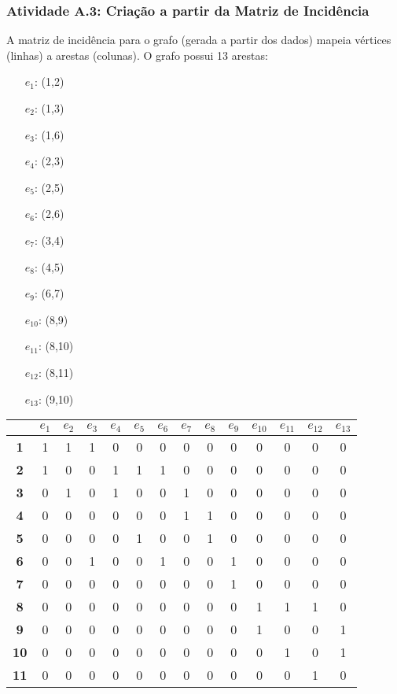 \documentclass[a4paper,12pt]{article}
\begin{document}
\subsubsection*{Atividade A.3: Criação a partir da Matriz de Incidência}
A matriz de incidência para o grafo (gerada a partir dos dados) mapeia vértices (linhas) a arestas (colunas). O grafo possui 13 arestas:
\begin{multicols}{2}
\begin{itemize}[nosep, leftmargin=*]
    \item[$e_1$:] (1,2) \quad \item[$e_2$:] (1,3) \quad \item[$e_3$:] (1,6)
    \item[$e_4$:] (2,3) \quad \item[$e_5$:] (2,5) \quad \item[$e_6$:] (2,6)
    \item[$e_7$:] (3,4) \quad \item[$e_8$:] (4,5) \quad \item[$e_9$:] (6,7)
    \item[$e_{10}$:] (8,9) \quad \item[$e_{11}$:] (8,10) \quad \item[$e_{12}$:] (8,11)
    \item[$e_{13}$:] (9,10)
\end{itemize}
\end{multicols}
\begin{center}
\scriptsize
\begin{tabular*}{\textwidth}{c|@{\extracolsep{\fill}}ccccccccccccc}
\rowcolor[gray]{0.9}
 & \textbf{$e_1$} & \textbf{$e_2$} & \textbf{$e_3$} & \textbf{$e_4$} & \textbf{$e_5$} & \textbf{$e_6$} & \textbf{$e_7$} & \textbf{$e_8$} & \textbf{$e_9$} & \textbf{$e_{10}$} & \textbf{$e_{11}$} & \textbf{$e_{12}$} & \textbf{$e_{13}$} \\
\hline
\textbf{1} & 1 & 1 & 1 & 0 & 0 & 0 & 0 & 0 & 0 & 0 & 0 & 0 & 0 \\
\textbf{2} & 1 & 0 & 0 & 1 & 1 & 1 & 0 & 0 & 0 & 0 & 0 & 0 & 0 \\
\textbf{3} & 0 & 1 & 0 & 1 & 0 & 0 & 1 & 0 & 0 & 0 & 0 & 0 & 0 \\
\textbf{4} & 0 & 0 & 0 & 0 & 0 & 0 & 1 & 1 & 0 & 0 & 0 & 0 & 0 \\
\textbf{5} & 0 & 0 & 0 & 0 & 1 & 0 & 0 & 1 & 0 & 0 & 0 & 0 & 0 \\
\textbf{6} & 0 & 0 & 1 & 0 & 0 & 1 & 0 & 0 & 1 & 0 & 0 & 0 & 0 \\
\textbf{7} & 0 & 0 & 0 & 0 & 0 & 0 & 0 & 0 & 1 & 0 & 0 & 0 & 0 \\
\textbf{8} & 0 & 0 & 0 & 0 & 0 & 0 & 0 & 0 & 0 & 1 & 1 & 1 & 0 \\
\textbf{9} & 0 & 0 & 0 & 0 & 0 & 0 & 0 & 0 & 0 & 1 & 0 & 0 & 1 \\
\textbf{10} & 0 & 0 & 0 & 0 & 0 & 0 & 0 & 0 & 0 & 0 & 1 & 0 & 1 \\
\textbf{11} & 0 & 0 & 0 & 0 & 0 & 0 & 0 & 0 & 0 & 0 & 0 & 1 & 0 \\
\end{tabular*}
\end{center}
\end{document}
